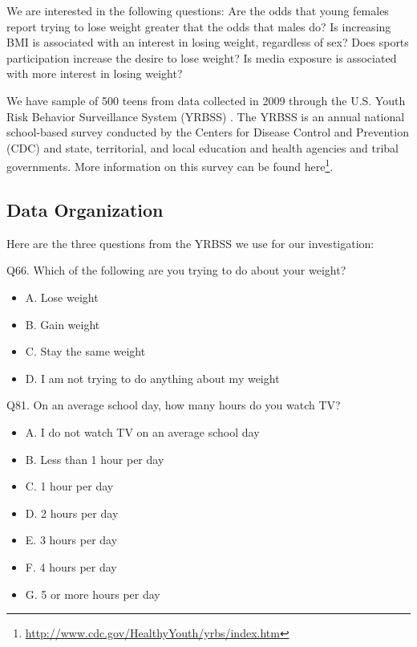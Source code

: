 \documentclass[
]{krantz}
\providecommand{\tightlist}{%
  \setlength{\itemsep}{0pt}\setlength{\parskip}{0pt}}
\renewcommand{\href}[2]{#2\footnote{\url{#1}}}
\begin{document}
We are interested in the following questions: Are the odds that young females report trying to lose weight greater that the odds that males do? Is increasing BMI is associated with an interest in losing weight, regardless of sex? Does sports participation increase the desire to lose weight? Is media exposure is associated with more interest in losing weight?

We have sample of 500 teens from data collected in 2009 through the U.S. Youth Risk Behavior Surveillance System (YRBSS) \citep{YRBS2009}. The YRBSS is an annual national school-based survey conducted by the Centers for Disease Control and Prevention (CDC) and state, territorial, and local education and health agencies and tribal governments. More information on this survey can be found \href{http://www.cdc.gov/HealthyYouth/yrbs/index.htm}{here}.

\hypertarget{data-organization-4}{%
\subsection{Data Organization}\label{data-organization-4}}

Here are the three questions from the YRBSS we use for our investigation:

Q66. Which of the following are you trying to do about your weight?

\begin{itemize}
\tightlist
\item
  A. Lose weight
\item
  B. Gain weight
\item
  C. Stay the same weight
\item
  D. I am not trying to do anything about my weight
\end{itemize}

Q81. On an average school day, how many hours do you watch TV?

\begin{itemize}
\tightlist
\item
  A. I do not watch TV on an average school day
\item
  B. Less than 1 hour per day
\item
  C. 1 hour per day
\item
  D. 2 hours per day
\item
  E. 3 hours per day
\item
  F. 4 hours per day
\item
  G. 5 or more hours per day
\end{itemize}
\end{document}
